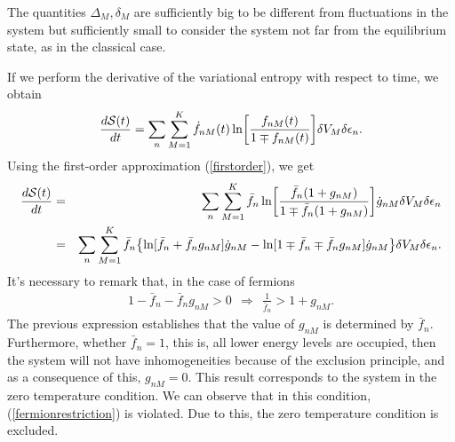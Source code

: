   The quantities $\Delta_M,\delta_M$ are sufficiently big to be different from
fluctuations in the system but sufficiently small to consider the system not
far from the equilibrium state, as in the classical case. 

If we perform the derivative of the variational entropy with respect to time,
we obtain
%
\begin{equation}
   \frac{d \Ss (t)}{dt}= \sum_n \sum_{M=1}^{K} \dot{f}_{nM}(t)\ln \left[ \frac{f_{nM}(t)}{1\mp f_{nM}(t)} \right] \de V_M \delta \epsilon_n.\label{deltaH}
\end{equation}
%
Using the first-order approximation (\ref{firstorder}), we get
%
\begin{eqnarray}
    \frac{d\Ss (t)}{dt}&=&\sum_n \sum_{M=1}^{K} \bar{f}_{n}\ln \left[ \frac{\bar{f}_{n}(1+g_{nM})}{1\mp \bar{f}_{n} (1+ g_{nM})} \right]\dot{g}_{nM} \de V_M\delta \epsilon_n \nonumber \\
    &=&\sum_n \sum_{M=1}^{K} \bar{f}_n \left \{ \ln [\bar{f}_n+\bar{f}_n g_{nM}]\dot{g}_{nM}-\ln [1\mp\bar{f}_n\mp\bar{f}_n g_{nM}]\dot{g}_{nM}  \right \}\de V_M \delta \epsilon_n.\nonumber \\
    \label{cambioH1}
\end{eqnarray}
%
It's necessary to remark that, in the case of fermions
%
\begin{eqnarray}
   1-\bar f_n -\bar f_n g_{nM}>0 \ \ \Rightarrow \ \ \frac{1}{\bar f_n}>1+g_{nM}. \label{fermionrestriction}
\end{eqnarray}
%
The previous expression establishes that the value of $g_{nM}$ is determined by
$\bar f_n$. Furthermore, whether $\bar f_{n}=1$, this is, all lower energy
levels are occupied, then the system will not have inhomogeneities because of
the exclusion principle, and as a consequence of this,  $g_{nM}=0$. This result
corresponds to the system in the zero temperature condition. We can observe
that in this condition, (\ref{fermionrestriction}) is violated. Due to this,
the zero temperature condition is excluded.


